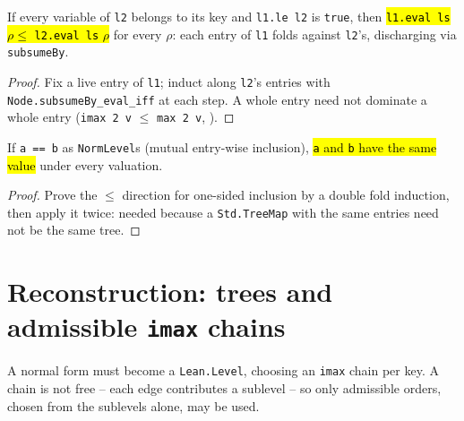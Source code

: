 \begin{theorem}
\label{thm:lvl-le-eval}
\leanok
{}

 If every variable of \texttt{l2} belongs to its key and \texttt{l1.le l2} is
\texttt{true}, then \hl{\texttt{l1.eval ls} $\rho \le$ \texttt{l2.eval ls} $\rho$} for every $\rho$: each
entry of \texttt{l1} folds against \texttt{l2}'s, discharging via \texttt{subsumeBy}.
\end{theorem}
\begin{proof}
\leanok
{} Fix a live entry of \texttt{l1}; induct along \texttt{l2}'s entries with
\texttt{Node.subsumeBy\_eval\_iff} at each step. A whole entry need not dominate a whole entry
(\texttt{imax 2 v} $\le$ \texttt{max 2 v}, ).
\end{proof}

\begin{lemma}
\label{thm:lvl-eval-congr}
\leanok
{}

 If \texttt{a == b} as \texttt{NormLevel}s (mutual entry-wise inclusion), \hl{\texttt{a}
and \texttt{b} have the same value} under every valuation.
\end{lemma}
\begin{proof}
\leanok
{} Prove the $\le$ direction for one-sided inclusion by a double fold induction, then apply
it twice: needed because a \texttt{Std.TreeMap} with the same entries need not be the same tree.
\end{proof}

\section{Reconstruction: trees and admissible \texttt{imax} chains}
\label{sec:lvl-reconstruction}

A normal form must become a \texttt{Lean.Level}, choosing an \texttt{imax} chain per key. A chain is
not free -- each edge contributes a sublevel -- so only admissible orders, chosen from the sublevels
alone, may be used.

